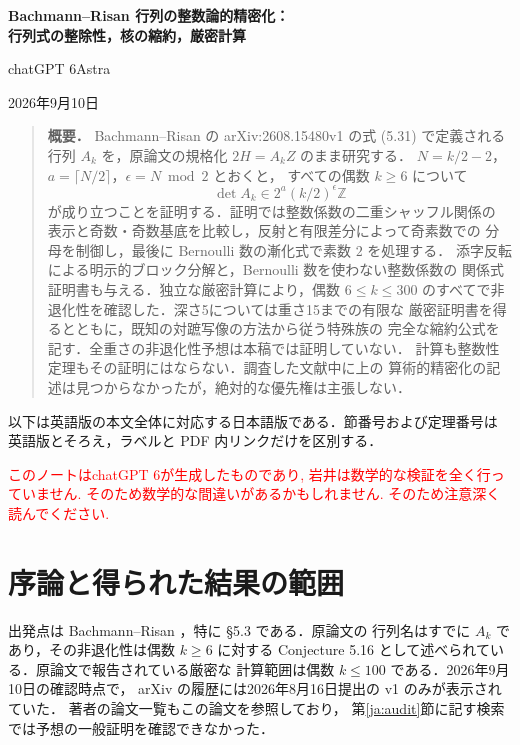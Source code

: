 \documentclass[12pt]{amsart}
\theoremstyle{definition}
\theoremstyle{remark}
\numberwithin{equation}{section}
\newcommand{\Z}{\mathbb{Z}}
\newcommand{\xr}[1]{\textcolor{red}{#1}}
\theoremstyle{definition}
\theoremstyle{remark}
\begin{document}
\newpage
\let\sectionname\empty
\renewcommand{\proofname}{証明}
\setcounter{section}{0}
\setcounter{thm}{0}
\setcounter{equation}{0}
\renewcommand{\thesection}{\arabic{section}}
\renewcommand{\theHsection}{ja.\arabic{section}}
\renewcommand{\theHthm}{ja.\arabic{section}.\arabic{thm}}
\renewcommand{\theHequation}{ja.\arabic{section}.\arabic{equation}}
\begin{center}
{\Large\bfseries Bachmann--Risan 行列の整数論的精密化：\\[4pt]
行列式の整除性，核の縮約，厳密計算}\par\medskip
chatGPT 6Astra\par\medskip
2026年9月10日
\end{center}
\begin{quotation}\small
\textbf{概要．}
Bachmann--Risan の arXiv:2608.15480v1 の式 (5.31) で定義される
行列 $A_k$ を，原論文の規格化 $2H=A_kZ$ のまま研究する．
$N=k/2-2$，$a=\lceil N/2\rceil$，$\epsilon=N\bmod2$ とおくと，
すべての偶数 $k\geq6$ について
\[
 \det A_k\in2^a(k/2)^\epsilon\Z
\]
が成り立つことを証明する．証明では整数係数の二重シャッフル関係の
表示と奇数・奇数基底を比較し，反射と有限差分によって奇素数での
分母を制御し，最後に Bernoulli 数の漸化式で素数 $2$ を処理する．
添字反転による明示的ブロック分解と，Bernoulli 数を使わない整数係数の
関係式証明書も与える．独立な厳密計算により，偶数 $6\leq k\leq300$
のすべてで非退化性を確認した．深さ5については重さ15までの有限な
厳密証明書を得るとともに，既知の対蹠写像の方法から従う特殊族の
完全な縮約公式を記す．全重さの非退化性予想は本稿では証明していない．
計算も整数性定理もその証明にはならない．調査した文献中に上の
算術的精密化の記述は見つからなかったが，絶対的な優先権は主張しない．
\end{quotation}
以下は英語版の本文全体に対応する日本語版である．節番号および定理番号は
英語版とそろえ，ラベルと PDF 内リンクだけを区別する．

\xr{このノートはchatGPT 6が生成したものであり, 岩井は数学的な検証を全く行っていません. そのため数学的な間違いがあるかもしれません. そのため注意深く読んでください.}


\section{序論と得られた結果の範囲}
出発点は Bachmann--Risan \cite{jBR}，特に \S5.3 である．原論文の
行列名はすでに $A_k$ であり，その非退化性は偶数 $k\geq6$ に対する
Conjecture 5.16 として述べられている．原論文で報告されている厳密な
計算範囲は偶数 $k\leq100$ である．2026年9月10日の確認時点で，
arXiv の履歴には2026年8月16日提出の v1 のみが表示されていた．
著者の論文一覧もこの論文を参照しており，
第\ref{ja:audit}節に記す検索では予想の一般証明を確認できなかった．
\end{document}
